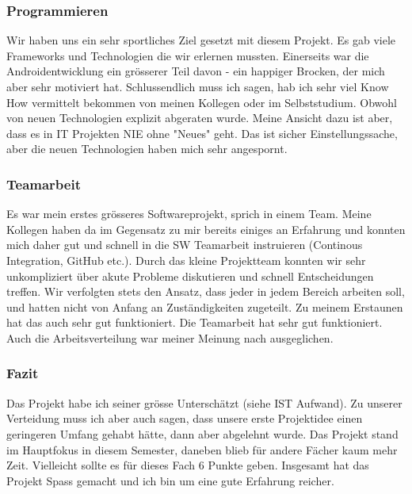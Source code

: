 \documentclass[10pt,a4paper]{scrartcl}
\begin{document}
\subsubsection*{Programmieren}
Wir haben uns ein sehr sportliches Ziel gesetzt mit diesem Projekt. Es gab viele Frameworks und Technologien die wir erlernen mussten. Einerseits war die Androidentwicklung ein grösserer Teil davon - ein happiger Brocken, der mich aber sehr motiviert hat.
Schlussendlich muss ich sagen, hab ich sehr viel Know How vermittelt bekommen von meinen Kollegen oder im Selbststudium. Obwohl von neuen Technologien explizit abgeraten wurde.
Meine Ansicht dazu ist aber, dass es in IT Projekten NIE ohne "Neues" geht. Das ist sicher Einstellungssache, aber die neuen Technologien haben mich sehr angespornt. 

\subsubsection*{Teamarbeit}
Es war mein erstes grösseres Softwareprojekt, sprich in einem Team. Meine Kollegen haben da im Gegensatz zu mir bereits einiges an Erfahrung und konnten mich daher gut und schnell in die SW Teamarbeit instruieren (Continous Integration, GitHub etc.). Durch das kleine Projektteam konnten wir sehr unkompliziert über akute Probleme diskutieren und schnell Entscheidungen treffen. Wir verfolgten stets den Ansatz, dass jeder in jedem Bereich arbeiten soll, und hatten nicht von Anfang an Zuständigkeiten zugeteilt. Zu meinem Erstaunen hat das auch sehr gut funktioniert. Die Teamarbeit hat sehr gut funktioniert. Auch die Arbeitsverteilung war meiner Meinung nach ausgeglichen. 

\subsubsection*{Fazit}
Das Projekt habe ich seiner grösse Unterschätzt (siehe IST Aufwand). Zu unserer Verteidung muss ich aber auch sagen, dass unsere erste Projektidee einen geringeren Umfang gehabt hätte, dann aber abgelehnt wurde. Das Projekt stand im Hauptfokus in diesem Semester, daneben blieb für andere Fächer kaum mehr Zeit. Vielleicht sollte es für dieses Fach 6 Punkte geben. Insgesamt hat das Projekt Spass gemacht und ich bin um eine gute Erfahrung reicher.

\newpage
\end{document}
